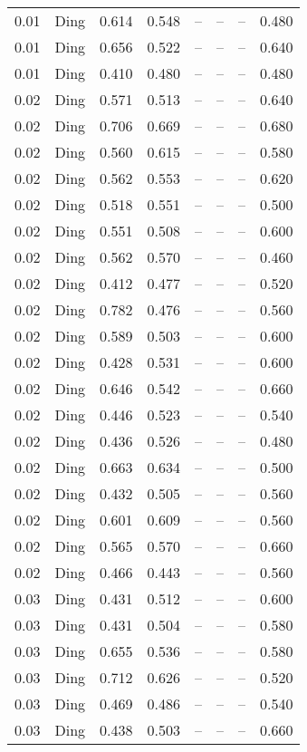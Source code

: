 \begin{table}[H]
\begin{tabular}{l c l l l}
0.01 & Ding & 0.614 & 0.548 & -- & -- & -- & 0.480 \\
0.01 & Ding & 0.656 & 0.522 & -- & -- & -- & 0.640 \\
0.01 & Ding & 0.410 & 0.480 & -- & -- & -- & 0.480 \\
0.02 & Ding & 0.571 & 0.513 & -- & -- & -- & 0.640 \\
0.02 & Ding & 0.706 & 0.669 & -- & -- & -- & 0.680 \\
0.02 & Ding & 0.560 & 0.615 & -- & -- & -- & 0.580 \\
0.02 & Ding & 0.562 & 0.553 & -- & -- & -- & 0.620 \\
0.02 & Ding & 0.518 & 0.551 & -- & -- & -- & 0.500 \\
0.02 & Ding & 0.551 & 0.508 & -- & -- & -- & 0.600 \\
0.02 & Ding & 0.562 & 0.570 & -- & -- & -- & 0.460 \\
0.02 & Ding & 0.412 & 0.477 & -- & -- & -- & 0.520 \\
0.02 & Ding & 0.782 & 0.476 & -- & -- & -- & 0.560 \\
0.02 & Ding & 0.589 & 0.503 & -- & -- & -- & 0.600 \\
0.02 & Ding & 0.428 & 0.531 & -- & -- & -- & 0.600 \\
0.02 & Ding & 0.646 & 0.542 & -- & -- & -- & 0.660 \\
0.02 & Ding & 0.446 & 0.523 & -- & -- & -- & 0.540 \\
0.02 & Ding & 0.436 & 0.526 & -- & -- & -- & 0.480 \\
0.02 & Ding & 0.663 & 0.634 & -- & -- & -- & 0.500 \\
0.02 & Ding & 0.432 & 0.505 & -- & -- & -- & 0.560 \\
0.02 & Ding & 0.601 & 0.609 & -- & -- & -- & 0.560 \\
0.02 & Ding & 0.565 & 0.570 & -- & -- & -- & 0.660 \\
0.02 & Ding & 0.466 & 0.443 & -- & -- & -- & 0.560 \\
0.03 & Ding & 0.431 & 0.512 & -- & -- & -- & 0.600 \\
0.03 & Ding & 0.431 & 0.504 & -- & -- & -- & 0.580 \\
0.03 & Ding & 0.655 & 0.536 & -- & -- & -- & 0.580 \\
0.03 & Ding & 0.712 & 0.626 & -- & -- & -- & 0.520 \\
0.03 & Ding & 0.469 & 0.486 & -- & -- & -- & 0.540 \\
0.03 & Ding & 0.438 & 0.503 & -- & -- & -- & 0.660 \\

\end{tabular}
\end{table}
